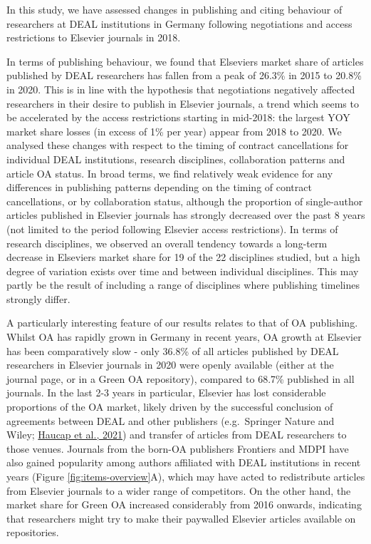 \documentclass[
]{article}
\begin{document}
In this study, we have assessed changes in publishing and citing behaviour of researchers at DEAL institutions in Germany following negotiations and access restrictions to Elsevier journals in 2018.

In terms of publishing behaviour, we found that Elsevier\textquotesingle s market share of articles published by DEAL researchers has fallen from a peak of 26.3\% in 2015 to 20.8\% in 2020. This is in line with the hypothesis that negotiations negatively affected researchers in their desire to publish in Elsevier journals, a trend which seems to be accelerated by the access restrictions starting in mid-2018: the largest YOY market share losses (in excess of 1\% per year) appear from 2018 to 2020. We analysed these changes with respect to the timing of contract cancellations for individual DEAL institutions, research disciplines, collaboration patterns and article OA status. In broad terms, we find relatively weak evidence for any differences in publishing patterns depending on the timing of contract cancellations, or by collaboration status, although the proportion of single-author articles published in Elsevier journals has strongly decreased over the past 8 years (not limited to the period following Elsevier access restrictions). In terms of research disciplines, we observed an overall tendency towards a long-term decrease in Elsevier\textquotesingle s market share for 19 of the 22 disciplines studied, but a high degree of variation exists over time and between individual disciplines. This may partly be the result of including a range of disciplines where publishing timelines strongly differ.

A particularly interesting feature of our results relates to that of OA publishing. Whilst OA has rapidly grown in Germany in recent years, OA growth at Elsevier has been comparatively slow - only 36.8\% of all articles published by DEAL researchers in Elsevier journals in 2020 were openly available (either at the journal page, or in a Green OA repository), compared to 68.7\% published in all journals. In the last 2-3 years in particular, Elsevier has lost considerable proportions of the OA market, likely driven by the successful conclusion of agreements between DEAL and other publishers (e.g.~Springer Nature and Wiley; \href{https://doi.org/10.1002/mde.3493}{Haucap et al., 2021}) and transfer of articles from DEAL researchers to those venues. Journals from the born-OA publishers Frontiers and MDPI have also gained popularity among authors affiliated with DEAL institutions in recent years (Figure \ref{fig:items-overview}A), which may have acted to redistribute articles from Elsevier journals to a wider range of competitors. On the other hand, the market share for Green OA increased considerably from 2016 onwards, indicating that researchers might try to make their paywalled Elsevier articles available on repositories.
\end{document}
